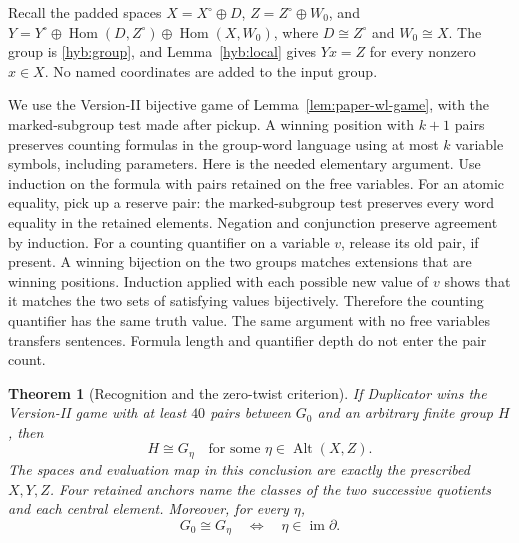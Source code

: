 \documentclass[11pt]{article}
\DeclareMathOperator{\Hom}{Hom}
\DeclareMathOperator{\Alt}{Alt}
\newtheorem{theorem}{Theorem}[section]
\theoremstyle{definition}
\theoremstyle{remark}
\numberwithin{equation}{section}
\begin{document}
Recall the padded spaces
\(X=X^\circ\oplus D\), \(Z=Z^\circ\oplus W_0\), and
\(Y=Y^\circ\oplus\Hom(D,Z^\circ)\oplus\Hom(X,W_0)\), where
\(D\cong Z^\circ\) and \(W_0\cong X\).
The group is \eqref{hyb:group}, and Lemma~\ref{hyb:local} gives
\(Yx=Z\) for every nonzero \(x\in X\).
No named coordinates are added to the input group.

We use the Version-II bijective game of Lemma~\ref{lem:paper-wl-game}, with the marked-subgroup test
made after pickup.  A winning position with \(k+1\) pairs preserves
counting formulas in the group-word language using at most \(k\)
variable symbols, including parameters.  Here is the needed elementary
argument.  
Use induction on the formula with pairs retained on the free variables.
For an atomic equality, pick up a reserve pair: the marked-subgroup test
preserves every word equality in the retained elements. Negation and
conjunction preserve agreement by induction. For a counting quantifier
on a variable \(v\), release its old pair, if present. A winning
bijection on the two groups matches extensions that are winning
positions. Induction applied with each possible new value of \(v\)
shows that it matches the two sets of satisfying values bijectively.
Therefore the counting quantifier has the same truth value. The same
argument with no free variables transfers sentences. Formula length
and quantifier depth do not enter the pair count.
\begin{theorem}[Recognition and the zero-twist criterion]
\label{hyb:allmates}
If Duplicator wins the Version-II game with at least \(40\) pairs
between \(G_0\) and an arbitrary finite group \(H\), then
\[
 H\cong G_\eta
 \quad\text{for some }\eta\in\Alt(X,Z).
\]
The spaces and evaluation map in this conclusion are exactly the
prescribed \(X,Y,Z\).  Four retained anchors name the classes of the two successive quotients
and each central element.  Moreover, for every \(\eta\),
\begin{equation}
 G_0\cong G_\eta
 \quad\Longleftrightarrow\quad
 \eta\in\operatorname{im}\partial.
 \label{hyb:zero-isomorphism}
\end{equation}
\end{theorem}
\end{document}
